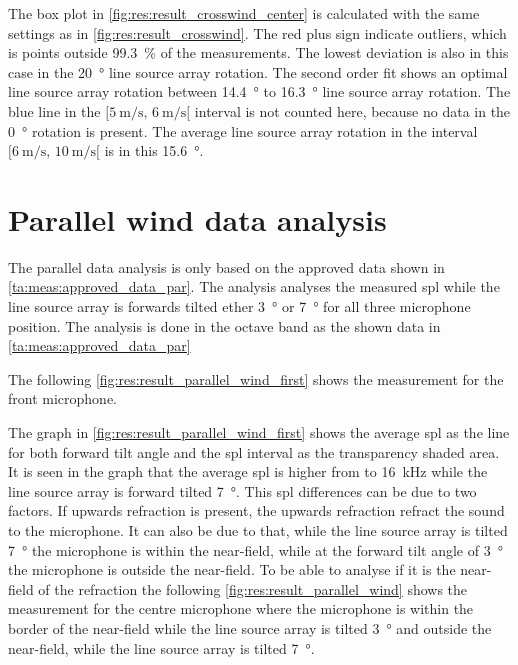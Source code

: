 The box plot in \autoref{fig:res:result_crosswind_center} is calculated with the same settings as in  \autoref{fig:res:result_crosswind}. The red plus sign indicate outliers, which is points outside \SI{99.3}{\percent} of the measurements. The lowest deviation is also in this case in the \SI{20}{\degree} line source array rotation. The second order fit shows an optimal line source array rotation between \SI{14.4}{\degree} to \SI{16.3}{\degree} line source array rotation. The blue line in the $[\SI{5}{\meter\per\second},\, \SI{6}{\meter\per\second}[ $ interval is not counted here, because no data in the \SI{0}{\degree} rotation is present. The average line source array rotation in the interval $[\SI{6}{\meter\per\second},\, \SI{10}{\meter\per\second}[ $ is in this \SI{15.6}{\degree}.
  
  

\section{Parallel wind data analysis}\label{res:par_data_ana}

The parallel data analysis is only based on the approved data shown in \autoref{ta:meas:approved_data_par}. The analysis analyses the measured \gls{spl} while the line source array is forwards tilted ether \SI{3}{\degree} or  \SI{7}{\degree} for all three microphone position. The analysis is done in the octave band as the shown data in \autoref{ta:meas:approved_data_par}

 The following \autoref{fig:res:result_parallel_wind_first}  shows the measurement for the front microphone.

  
The graph in \autoref{fig:res:result_parallel_wind_first} shows the average \gls{spl} as the line for both forward tilt angle and the \gls{spl} interval as the transparency shaded area.
It is seen in the graph that the average \gls{spl} is higher from  to \SI{16}{\kilo\hertz} while the line source array is forward tilted \SI{7}{\degree}. This \gls{spl} differences can be due to two factors. If upwards refraction is present, the upwards refraction refract the sound to the microphone. It can also be due to that, while the line source array is tilted \SI{7}{\degree} the microphone is within the near-field, while at the forward tilt angle of \SI{3}{\degree} the microphone is outside the near-field. To be able to analyse if it is the near-field of the refraction the following \autoref{fig:res:result_parallel_wind} shows the measurement for the centre microphone where the microphone is within the border of the near-field while the line source array is tilted \SI{3}{\degree} and outside the near-field, while the line source array is tilted \SI{7}{\degree}.
 

